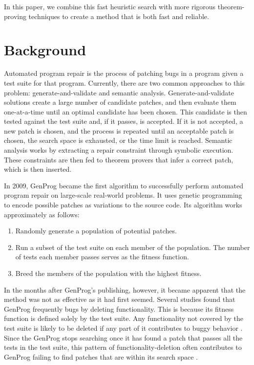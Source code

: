 \documentclass[conference]{IEEEtran}
\begin{document}
In this paper, we combine this fast heuristic search with more rigorous theorem-proving techniques to create a method that is both fast and reliable. 



\section{Background}

Automated program repair is the process of patching bugs in a program given a test suite for that program. 
Currently, there are two common approaches to this problem: generate-and-validate and semantic analysis. 
Generate-and-validate solutions create a large number of candidate patches, and then evaluate them one-at-a-time until an optimal candidate has been chosen. 
This candidate is then tested against the test suite and, if it passes, is accepted. 
If it is not accepted, a new patch is chosen, and the process is repeated until an acceptable patch is chosen, the search space is exhausted, or the time limit is reached. 
Semantic analysis works by extracting a repair constraint through symbolic execution. These constraints are then fed to theorem provers that infer a correct patch, which is then inserted. 

In 2009, GenProg became the first algorithm to successfully perform automated program repair on large-scale real-world problems. 
It uses genetic programming to encode possible patches as variations to the source code. 
Its algorithm works approximately as follows:
\begin{enumerate}
\item Randomly generate a population of potential patches.
\item Run a subset of the test suite on each member of the population. The number of tests each member passes serves as the fitness function.
\item Breed the members of the population with the highest fitness.
\end{enumerate}

In the months after GenProg's publishing, however, it became apparent that the method was not as effective as it had first seemed. 
Several studies found that GenProg frequently  bugs by deleting functionality. 
This is because its fitness function is defined solely by the test suite. 
Any functionality not covered by the test suite is likely to be deleted if any part of it contributes to buggy behavior \cite{plausibility}. 
Since the GenProg stops searching once it has found a patch that passes all the tests in the test suite, this pattern of functionality-deletion often contributes to GenProg failing to find patches that are within its search space \cite{searchspace}.
\end{document}

